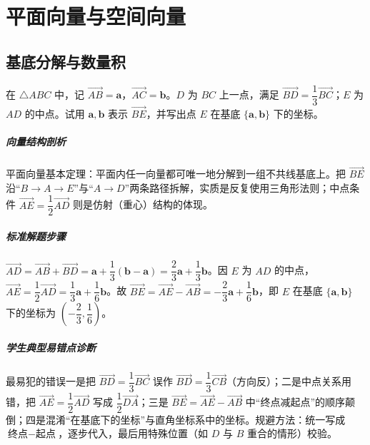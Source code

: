\chapter{平面向量与空间向量}

\section{基底分解与数量积}

\begin{problem}
在 $\triangle ABC$ 中，记 $\overrightarrow{AB}=\bm a$，$\overrightarrow{AC}=\bm b$。$D$ 为 $BC$ 上一点，满足 $\overrightarrow{BD}=\dfrac13\overrightarrow{BC}$；$E$ 为 $AD$ 的中点。试用 $\bm a,\bm b$ 表示 $\overrightarrow{BE}$，并写出点 $E$ 在基底 $\{\bm a,\bm b\}$ 下的坐标。
\end{problem}
\begin{solution}
\paragraph{向量结构剖析}
平面向量基本定理：平面内任一向量都可唯一地分解到一组不共线基底上。把 $\overrightarrow{BE}$ 沿“$B\to A\to E$”与“$A\to D$”两条路径拆解，实质是反复使用三角形法则；中点条件 $\overrightarrow{AE}=\dfrac12\overrightarrow{AD}$ 则是仿射（重心）结构的体现。
\paragraph{标准解题步骤}
$\overrightarrow{AD}=\overrightarrow{AB}+\overrightarrow{BD}=\bm a+\dfrac13(\bm b-\bm a)=\dfrac23\bm a+\dfrac13\bm b$。因 $E$ 为 $AD$ 的中点，$\overrightarrow{AE}=\dfrac12\overrightarrow{AD}=\dfrac13\bm a+\dfrac16\bm b$。故 $\overrightarrow{BE}=\overrightarrow{AE}-\overrightarrow{AB}=-\dfrac23\bm a+\dfrac16\bm b$，即 $E$ 在基底 $\{\bm a,\bm b\}$ 下的坐标为 $\left(-\dfrac23,\dfrac16\right)$。
\paragraph{学生典型易错点诊断}
最易犯的错误一是把 $\overrightarrow{BD}=\dfrac13\overrightarrow{BC}$ 误作 $\overrightarrow{BD}=\dfrac13\overrightarrow{CB}$（方向反）；二是中点关系用错，把 $\overrightarrow{AE}=\dfrac12\overrightarrow{AD}$ 写成 $\dfrac12\overrightarrow{DA}$；三是 $\overrightarrow{BE}=\overrightarrow{AE}-\overrightarrow{AB}$ 中“终点减起点”的顺序颠倒；四是混淆“在基底下的坐标”与直角坐标系中的坐标。规避方法：统一写成 $\text{终点}-\text{起点}$，逐步代入，最后用特殊位置（如 $D$ 与 $B$ 重合的情形）校验。
\end{solution}

